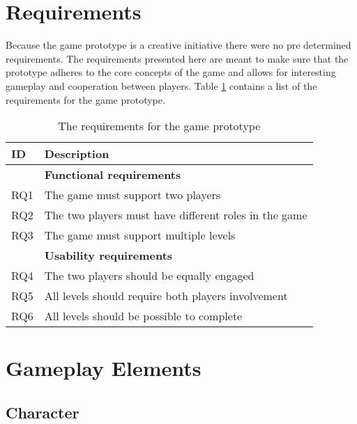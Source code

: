 



\section{Requirements}
Because the game prototype is a creative initiative there were no pre determined requirements. The requirements presented here are meant to make sure that the prototype adheres to the core concepts of the game and allows for interesting gameplay and cooperation between players. Table \ref{tab:requirements} contains a list of the requirements for the game prototype. 



\begin{table}[!ht]
	\centering
	\caption{The requirements for the game prototype}
	\label{tab:requirements}
	\begin{tabular}{|l|l|}
		\hline
		\textbf{ID} & \textbf{Description}                                  \\ \hline
					& \textbf{Functional requirements}                      \\ \hline
		RQ1         & The game must support two players                     \\
		RQ2         & The two players must have different roles in the game \\
		RQ3         & The game must support multiple levels                 \\ \hline
					& \textbf{Usability requirements}                       \\ \hline
		RQ4         & The two players should be equally engaged             \\
		RQ5         & All levels should require both players involvement    \\
		RQ6         & All levels should be possible to complete             \\ \hline
	\end{tabular}
\end{table}

\section{Gameplay Elements}
\subsection{Character}
